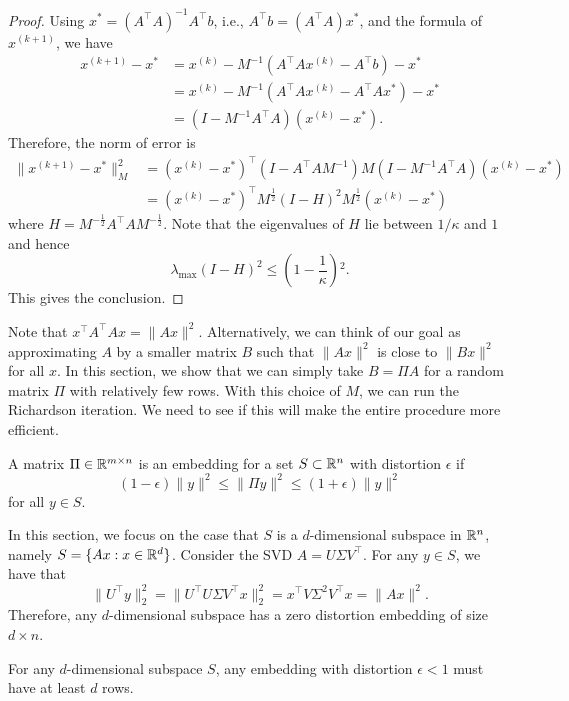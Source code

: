 \begin{proof}
Using $x^{*}=(A^{\top}A)^{-1}A^{\top}b$, i.e., $A^{\top}b=(A^{\top}A)x^{*}$,
and the formula of $x^{(k+1)}$, we have
\begin{align*}
x^{(k+1)}-x^{*} & =x^{(k)}-M^{-1}(A^{\top}Ax^{(k)}-A^{\top}b)-x^{*}\\
 & =x^{(k)}-M^{-1}(A^{\top}Ax^{(k)}-A^{\top}Ax^{*})-x^{*}\\
 & =\left(I-M^{-1}A^{\top}A\right)\left(x^{(k)}-x^{*}\right).
\end{align*}
Therefore, the norm of error is
\begin{align*}
\|x^{(k+1)}-x^{*}\|^{2}_{M} & =\left(x^{(k)}-x^{*}\right)^{\top}(I-A^{\top}AM^{-1})M(I-M^{-1}A^{\top}A)\left(x^{(k)}-x^{*}\right)\\
 & =\left(x^{(k)}-x^{*}\right)^{\top}M^{\frac{1}{2}}(I-H)^{2}M^{\frac{1}{2}}\left(x^{(k)}-x^{*}\right)
\end{align*}
where $H=M^{-\frac{1}{2}}A^{\top}AM^{-\frac{1}{2}}$. Note that the
eigenvalues of $H$ lie between $1/\kappa$ and $1$ and hence 
\[
\lambda_{\max}(I-H)^{2}\leq\left(1-\frac{1}{\kappa}\right){}^{2}.
\]
This gives the conclusion.
\end{proof}
Note that $x^{\top}A^{\top}Ax=\|Ax\|^{2}$. Alternatively, we can
think of our goal as approximating $A$ by a smaller matrix $B$ such
that $\|Ax\|^{2}$ is close to $\|Bx\|^{2}$ for all $x$. In this
section, we show that we can simply take $B=\Pi A$ for a random matrix
$\Pi$ with relatively few rows. With this choice of $M$, we can
run the Richardson iteration. We need to see if this will make the
entire procedure more efficient.
\begin{defn}
A matrix $\Pi\in\mathbb{R}^{m\times n}$ is an embedding for a set $S\subset\mathbb{R}^{n}$
with distortion $\epsilon$ if 
\[
(1-\epsilon)\|y\|^{2}\leq\|\Pi y\|^{2}\leq(1+\epsilon)\|y\|^{2}
\]
for all $y\in S$.
\end{defn}

In this section, we focus on the case that $S$ is a $d$-dimensional
subspace in $\mathbb{R}^{n}$, namely $S=\{Ax:x\in\mathbb{R}^{d}\}$. Consider the SVD
$A=U\Sigma V^{\top}$. For any $y\in S$, we have that
\[
\|U^{\top}y\|^{2}_{2}=\|U^{\top}U\Sigma V^{\top}x\|^{2}_{2}=x^{\top}V\Sigma^{2}V^{\top}x=\|Ax\|^{2}.
\]
Therefore, any $d$-dimensional subspace has a zero distortion embedding
of size $d\times n$.
\begin{xca}
For any $d$-dimensional subspace $S$, any embedding with distortion
$\epsilon<1$ must have at least $d$ rows.
\end{xca}

